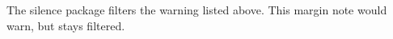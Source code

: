 \documentclass{article}
\begin{document}
The silence package filters the warning listed above.
This margin note would warn, but stays filtered.
\end{document}
